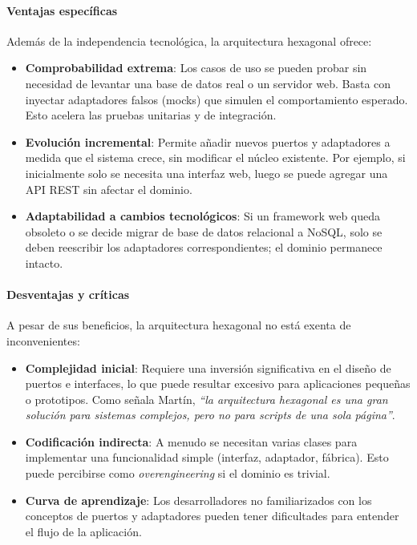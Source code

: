 \paragraph{Ventajas específicas}
Además de la independencia tecnológica, la arquitectura hexagonal ofrece:
\begin{itemize}
    \item \textbf{Comprobabilidad extrema}: Los casos de uso se pueden probar sin necesidad de levantar una base de datos real o un servidor web. Basta con inyectar adaptadores falsos (mocks) que simulen el comportamiento esperado. Esto acelera las pruebas unitarias y de integración.
    \item \textbf{Evolución incremental}: Permite añadir nuevos puertos y adaptadores a medida que el sistema crece, sin modificar el núcleo existente. Por ejemplo, si inicialmente solo se necesita una interfaz web, luego se puede agregar una API REST sin afectar el dominio.
    \item \textbf{Adaptabilidad a cambios tecnológicos}: Si un framework web queda obsoleto o se decide migrar de base de datos relacional a NoSQL, solo se deben reescribir los adaptadores correspondientes; el dominio permanece intacto.
\end{itemize}

\paragraph{Desventajas y críticas}
A pesar de sus beneficios, la arquitectura hexagonal no está exenta de inconvenientes:
\begin{itemize}
    \item \textbf{Complejidad inicial}: Requiere una inversión significativa en el diseño de puertos e interfaces, lo que puede resultar excesivo para aplicaciones pequeñas o prototipos. Como señala Martín\cite{hexagonalMartin}, \emph{``la arquitectura hexagonal es una gran solución para sistemas complejos, pero no para scripts de una sola página''}.
    \item \textbf{Codificación indirecta}: A menudo se necesitan varias clases para implementar una funcionalidad simple (interfaz, adaptador, fábrica). Esto puede percibirse como \emph{overengineering} si el dominio es trivial.
    \item \textbf{Curva de aprendizaje}: Los desarrolladores no familiarizados con los conceptos de puertos y adaptadores pueden tener dificultades para entender el flujo de la aplicación.
\end{itemize}

